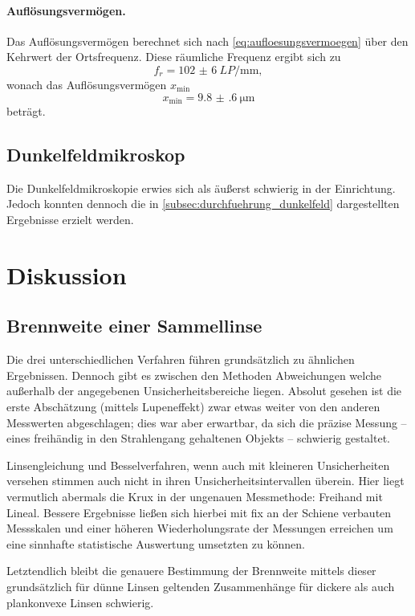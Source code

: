 \documentclass[ngerman]{scrartcl}
\begin{document}
\paragraph{Auflösungsvermögen.}
Das Auflösungsvermögen berechnet sich nach \autoref{eq:aufloesungsvermoegen} über den Kehrwert der Ortsfrequenz. Diese räumliche Frequenz ergibt sich zu
\[f_r = \SI{102(6)}{LP\per\milli\meter},\]
wonach das Auflösungsvermögen $x_\text{min}$
\[x_\text{min} = \SI{9.8(6)}{\micro\meter}\]
beträgt.


\subsection{Dunkelfeldmikroskop}
\label{subsec:auswertung_dunkelfeldmikroskop}

Die Dunkelfeldmikroskopie erwies sich als äußerst schwierig in der Einrichtung. Jedoch konnten dennoch die in \autoref{subsec:durchfuehrung_dunkelfeld} dargestellten Ergebnisse erzielt werden.



\section{Diskussion}
\label{sec:diskussion}

\subsection{Brennweite einer Sammellinse}
\label{subsec:diskussion_sammellinse}

Die drei unterschiedlichen Verfahren führen grundsätzlich zu ähnlichen Ergebnissen. Dennoch gibt es zwischen den Methoden Abweichungen welche außerhalb der angegebenen Unsicherheitsbereiche liegen. Absolut gesehen ist die erste Abschätzung (mittels Lupeneffekt) zwar etwas weiter von den anderen Messwerten abgeschlagen; dies war aber erwartbar, da sich die präzise Messung -- eines freihändig in den Strahlengang gehaltenen Objekts -- schwierig gestaltet.

Linsengleichung und Besselverfahren, wenn auch mit kleineren Unsicherheiten versehen stimmen auch nicht in ihren Unsicherheitsintervallen überein. Hier liegt vermutlich abermals die Krux in der ungenauen Messmethode: Freihand mit Lineal. Bessere Ergebnisse ließen sich hierbei mit fix an der Schiene verbauten Messskalen und einer höheren Wiederholungsrate der Messungen erreichen um eine sinnhafte statistische Auswertung umsetzten zu können.

Letztendlich bleibt die genauere Bestimmung der Brennweite mittels dieser grundsätzlich für dünne Linsen geltenden Zusammenhänge für dickere als auch plankonvexe Linsen schwierig.
\end{document}
